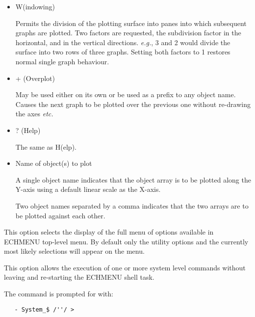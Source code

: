 \begin{itemize}
\item{\sunspec{\Large\tt}{\bf} W}(indowing)

     Permits the division of the plotting surface
     into panes into which subsequent graphs are plotted. Two factors are
     requested, the subdivision factor in the horizontal, and in the
     vertical directions. {\it{e.g.}}, 3 and 2 would divide the surface
     into two rows of three graphs. Setting both factors to 1 restores
     normal single graph behaviour.

\item{\sunspec{\Large\tt}{\bf} +} (Overplot)

     May be used either on its own or be used as a prefix to any object name.
     Causes the next graph to be plotted over the previous one without
     re-drawing the axes {\it etc.}

\item{\sunspec{\Large \tt}{\bf} ?} (Help)

     The same as H(elp).

\item{Name of object(s) to plot}

     A single object name indicates that the object array is to be plotted
     along the Y-axis using a default linear scale as the X-axis.

     Two object names separated by a comma indicates that the two arrays
     are to be plotted against each other.

\end{itemize}



This option selects the display of the full menu of options available in
ECHMENU top-level menu. By default only the utility options and the
currently most likely selections will appear on the menu.



This option allows the execution of one or more system level commands
without leaving and re-starting the ECHMENU shell task.

The command is prompted for with:

\begin{verbatim}
   - System_$ /''/ >
\end{verbatim}

